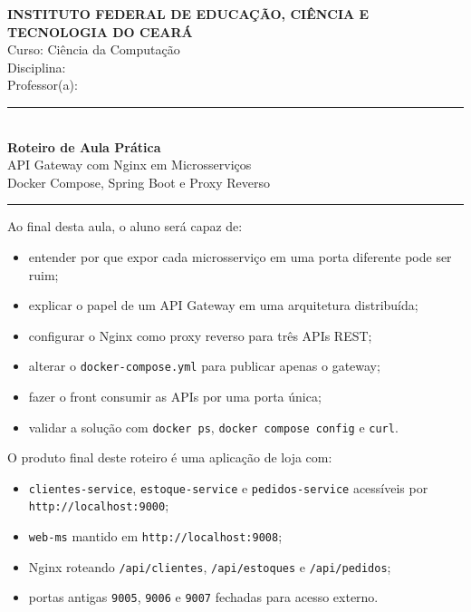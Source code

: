 \documentclass[12pt,a4paper]{article}
\newcommand{\campo}[1]{\underline{\hspace{#1}}}
\begin{document}
\begin{titlepage}
  \centering
  \vspace*{1cm}
  {\Large \textbf{INSTITUTO FEDERAL DE EDUCA\c{C}\~AO, CI\^ENCIA E TECNOLOGIA DO CEAR\'A}}\\[0.3cm]
  {\large Curso: Ci\^encia da Computa\c{c}\~ao}\\[0.1cm]
  {\large Disciplina: \campo{7cm}}\\[0.1cm]
  {\large Professor(a): \campo{6cm}}

  \vspace{2cm}

  \rule{\textwidth}{1.5pt}\\[0.4cm]
  {\Huge \textbf{Roteiro de Aula Pr\'atica}}\\[0.3cm]
  {\LARGE API Gateway com Nginx em Microsservi\c{c}os}\\[0.3cm]
  {\large Docker Compose, Spring Boot e Proxy Reverso}\\[0.4cm]
  \rule{\textwidth}{1.5pt}

  \vspace{2cm}

  \begin{infobox}
    Ao final desta aula, o aluno ser\'a capaz de:
    \begin{itemize}[leftmargin=1.5em]
      \item entender por que expor cada microsservi\c{c}o em uma porta diferente pode ser ruim;
      \item explicar o papel de um API Gateway em uma arquitetura distribu\'ida;
      \item configurar o Nginx como proxy reverso para tr\^es APIs REST;
      \item alterar o \texttt{docker-compose.yml} para publicar apenas o gateway;
      \item fazer o front consumir as APIs por uma porta \'unica;
      \item validar a solu\c{c}\~ao com \texttt{docker ps}, \texttt{docker compose config} e \texttt{curl}.
    \end{itemize}
  \end{infobox}

  \vspace{1.2cm}

  \begin{infobox}
    O produto final deste roteiro \'e uma aplica\c{c}\~ao de loja com:
    \begin{itemize}[leftmargin=1.5em]
      \item \texttt{clientes-service}, \texttt{estoque-service} e \texttt{pedidos-service} acess\'iveis por \texttt{http://localhost:9000};
      \item \texttt{web-ms} mantido em \texttt{http://localhost:9008};
      \item Nginx roteando \texttt{/api/clientes}, \texttt{/api/estoques} e \texttt{/api/pedidos};
      \item portas antigas \texttt{9005}, \texttt{9006} e \texttt{9007} fechadas para acesso externo.
    \end{itemize}
  \end{infobox}


\end{titlepage}
\end{document}
